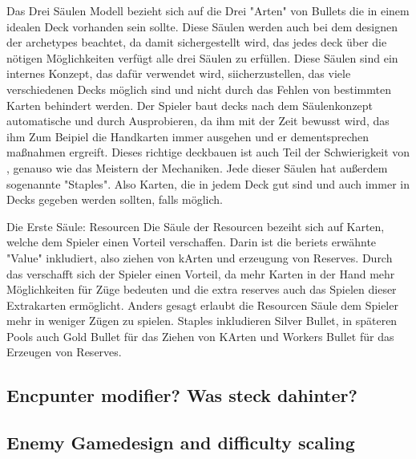 Das Drei Säulen Modell bezieht sich auf die Drei "Arten" von Bullets die in einem idealen Deck vorhanden sein sollte.
Diese Säulen werden auch bei dem designen der archetypes beachtet, da damit sichergestellt wird, das jedes deck über
die nötigen Möglichkeiten verfügt alle drei Säulen zu erfüllen. Diese Säulen sind ein internes Konzept, das dafür verwendet wird,
siicherzustellen, das viele verschiedenen Decks möglich sind und nicht durch das Fehlen von bestimmten Karten behindert werden.
Der Spieler baut decks nach dem Säulenkonzept automatische und durch Ausprobieren, da ihm mit der Zeit bewusst wird, das
ihm Zum Beipiel die Handkarten immer ausgehen und er dementsprechen maßnahmen ergreift. Dieses richtige deckbauen ist auch Teil der
Schwierigkeit von \FF, genauso wie das Meistern der Mechaniken.
Jede dieser Säulen hat außerdem sogenannte "Staples". Also Karten, die in jedem Deck gut sind und auch immer in Decks gegeben werden sollten, falls möglich.


Die Erste Säule: Resourcen
Die Säule der Resourcen bezeiht sich auf Karten, welche dem Spieler einen Vorteil verschaffen. Darin ist die beriets
erwähnte "Value" inkludiert, also ziehen von kArten und erzeugung von Reserves. Durch das verschafft sich der Spieler einen Vorteil,
da mehr Karten in der Hand mehr Möglichkeiten für Züge bedeuten und die extra reserves auch das Spielen dieser Extrakarten ermöglicht.
Anders gesagt erlaubt die Resourcen Säule dem Spieler mehr in weniger Zügen zu spielen.
Staples inkludieren Silver Bullet, in späteren Pools auch Gold Bullet für das Ziehen von KArten und Workers Bullet für das Erzeugen von Reserves.

\subsection{Encpunter modifier? Was steck dahinter?}\label{subsec:placementMatters}


\subsection{Enemy Gamedesign and difficulty scaling}\label{subsec:placementMatters}





